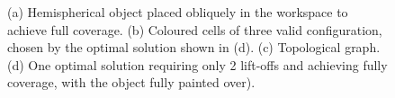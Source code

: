 \documentclass[journal]{IEEEtran}
\begin{document}
\begin{figure}[t]
\centering
{}
\caption{(a) Hemispherical object placed obliquely in the workspace to achieve full coverage. 
(b) Coloured cells of three valid configuration, chosen by the optimal solution shown in (d). %
(c) Topological graph. (d) One optimal solution requiring only 2 lift-offs and achieving fully coverage, with the object fully painted over). 
}\label{figsloped}
\end{figure}
\end{document}
